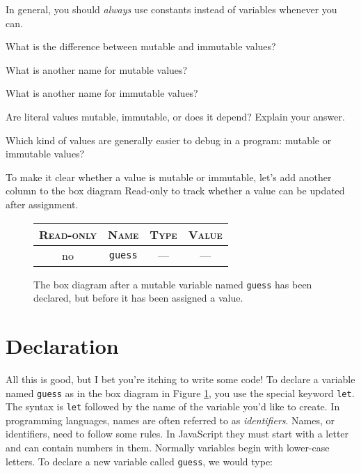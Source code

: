 \begin{center}
 In general, you should
\emph{always} use constants instead of variables whenever you can.
\end{center}

\begin{question}
  What is the difference between mutable and immutable values?
\end{question}

\begin{question}
  What is another name for mutable values?
\end{question}

\begin{question}
  What is another name for immutable values?
\end{question}

\begin{question}
Are literal values mutable, immutable, or does it depend? Explain your answer.\end{question}

\begin{question}
Which kind of values are generally easier to debug in a program: mutable or
immutable values?
\end{question}

To make it clear whether a value is mutable or immutable, let's add another
column to the box diagram \textsf{Read-only} to track whether a value can be
updated after assignment.

\begin{figure}[h]
  \begin{tabular}{|c|c|c|c|}
    \hline
    \textsc{Read-only} & \textsc{Name} & \textsc{Type} & \textsc{Value}\\
    \hline
    no & \texttt{guess} & --- & ---\\
    \hline
  \end{tabular}
\caption{\label{fig:intro-declared-variable} The box diagram after a mutable
variable named \texttt{guess} has been declared, but before it has been assigned
a value.}
\end{figure}

\section{Declaration}
All this is good, but I bet you're itching to write some code! To declare a
variable named \texttt{guess} as in the box diagram in Figure
\ref{fig:intro-declared-variable}, you use the special keyword \texttt{let}. The
syntax is \texttt{let} followed by the name of the variable you'd like to
create. In programming languages, names are often referred to as
\emph{identifiers}. Names, or identifiers, need to follow some rules. In
JavaScript they must start with a letter and can contain numbers in them.
Normally variables begin with lower-case letters. To declare a new variable
called \texttt{guess}, we would type:

